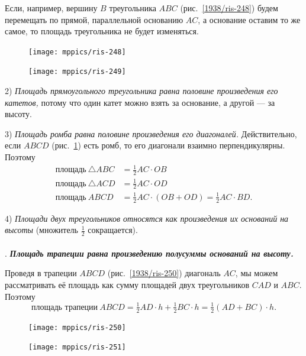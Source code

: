 \documentclass[oneside]{book}
\begin{document}
Если, например, вершину $B$ треугольника $ABC$ (рис.~\ref{1938/ris-248}) будем перемещать по прямой, параллельной основанию $AC$, а основание оставим то же самое, то площадь треугольника не будет изменяться.

\begin{figure}[h]
\begin{minipage}{.48\textwidth}
\centering
\texttt{[image: mppics/ris-248]}
\caption{}\label{1938/ris-248}
\end{minipage}
\hfill
\begin{minipage}{.48\textwidth}
\centering
\texttt{[image: mppics/ris-249]}
\caption{}\label{1938/ris-249}
\end{minipage}
\end{figure}


2) \emph{Площадь прямоугольного треугольника равна половине произведения его катетов,} потому что один катет можно взять за основание, а другой — за высоту.


3) \emph{Площадь ромба равна половине произведения его диагоналей.}
Действительно, если $ABCD$ (рис.~\ref{1938/ris-249}) есть ромб, то его диагонали взаимно перпендикулярны.
Поэтому
\begin{align*}
\text{площадь}~\triangle ABC&=\tfrac12AC\cdot  OB
\\
\text{площадь}~\triangle ACD&=\tfrac12AC\cdot  OD
\\ %
\text{площадь}~ABCD&=\tfrac12AC\cdot (OB+OD)=\tfrac12AC\cdot BD.
\end{align*}

4) \emph{Площади двух треугольников относятся как произведения их оснований на высоты} (множитель $\tfrac12$ сокращается).


\paragraph{}\label{1938/250}
.
\textbf{\emph{Площадь трапеции равна произведению полусуммы оснований на высоту.}}

Проведя в трапеции $ABCD$ (рис.~\ref{1938/ris-250}) диагональ $AC$, мы можем рассматривать её площадь как сумму площадей двух треугольников $CAD$ и $ABC$.
Поэтому
\[\text{площадь трапеции}~ABCD
=\tfrac12AD\cdot  h+\tfrac12BC\cdot  h= 
\tfrac12(AD+BC) \cdot  h.\]

\begin{figure}[h]
\begin{minipage}{.48\textwidth}
\centering
\texttt{[image: mppics/ris-250]}
\caption{}\label{1938/ris-250}
\end{minipage}
\hfill
\begin{minipage}{.48\textwidth}
\centering
\texttt{[image: mppics/ris-251]}
\caption{}\label{1938/ris-251}
\end{minipage}
\end{figure}
\end{document}
